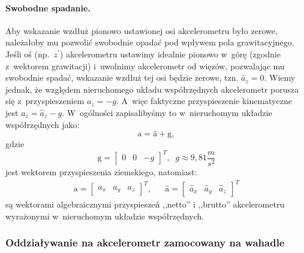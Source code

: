 \documentclass[paper=a4,DIV=12]{lpas}
\newcommand{\brm}[1]{\bm{\mathrm{#1}}}
\begin{document}
\begin{appendices}
\paragraph{Swobodne spadanie.}
Aby wskazanie wzdłuż pionowo ustawionej osi akcelerometru było zerowe,
należałoby mu pozwolić swobodnie opadać pod wpływem pola grawitacyjnego.
Jeśli oś (np.~$z^{\prime}$)  akcelerometru ustawimy idealnie pionowo w~górę
(zgodnie z~wektorem grawitacji) i~uwolnimy akcelerometr od więzów,
pozwalając mu swobodnie spadać, wskazanie wzdłuż tej osi będzie zerowe, tzn.
$\hat{a}_z =0$. Wiemy jednak, że względem nieruchomego układu współrzędnych
akcelerometr porusza się z~przyspieszeniem $a_z = -g$. A~więc faktyczne
przyspieszenie kinematyczne jest $a_z = \hat{a}_z - g$. W~ogólności
zapisalibyśmy to w~nieruchomym układzie współrzędnych jako:
\begin{equation}
  \brm{a} = \hat{\brm{a}} + \brm{g},
  \label{eq:QDX8V}
\end{equation}
gdzie
\begin{equation}
  \brm{g} = \begin{bmatrix} 0 & 0 & -g \end{bmatrix}^T, \;\; g \approx 9,81 \frac{m}{s^2}
  \label{eq:PWKKB}
\end{equation}
jest wektorem przyspieszenia ziemskiego, natomiast:
\begin{align}
  & \brm{a} = \begin{bmatrix}
    a_x & a_y & a_z
  \end{bmatrix}^T, &
  & \hat{\brm{a}} = \begin{bmatrix}
    \hat{a}_x & \hat{a}_y & \hat{a}_z
  \end{bmatrix}^T &
  \label{eq:0JPXH}
\end{align}
są wektorami algebraicznymi przyspieszeń ,,netto'' i ,,brutto'' akcelerometru
wyrażonymi w~nieruchomym układzie współrzędnych.

\subsubsection{Oddziaływanie na akcelerometr zamocowany na wahadle}
\label{sec:JO17Z}


\end{appendices}
\end{document}
